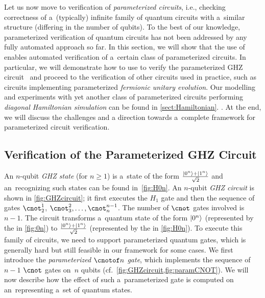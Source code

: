 Let us now move to verification of \emph{parameterized circuits}, i.e., checking
correctness of a~(typically) infinite family of quantum circuits with
a~similar structure (differing in the number of qubits).
To the best of our knowledge, parameterized verification of quantum circuits has
not been addressed by any fully automated approach so far.
In this section, we will show that the use of \lstas enables automated
verification of a~certain class of parameterized circuits.
In particular, 
we will demonstrate how to use \lstas to verify the parameterized GHZ
circuit~\cite{GreenbergerHZ89} and proceed to the verification of
other circuits used in practice, such as circuits implementing parameterized
\emph{fermionic unitary evolution}. Our modelling and experiments with yet another
class of parameterized circuits performing \emph{diagonal Hamiltonian
simulation} can be found in
\ifTR
\cref{sect:Hamiltonian}.
\else
\cite{techrep}.
\fi
At the end, we will discuss the challenges and a direction towards a~complete framework
for parameterized circuit verification.


\vspace{-0.0mm}
\subsection{Verification of the Parameterized GHZ Circuit}\label{sec:GHZ}
\vspace{-0.0mm}

An $n$-qubit \emph{GHZ state} (for $n \geq 1$) is a~state of the form
$\frac{\ket{0^n}+\ket{1^n}}{\sqrt{2}}$ and an~\lsta recognizing such states can be
found in~\cref{fig:H0n}. 
An $n$-qubit \emph{GHZ circuit} is shown in \cref{fig:GHZcircuit}; it first
executes the $H_1$ gate and then the sequence of gates $\cnot^{1}_{2}$,
$\cnot^{2}_{3},\ldots, \cnot^{n-1}_{n}$.
The number of $\cnot$ gates involved is $n-1$. 
The circuit transforms a~quantum state of the form $\ket{0^n}$ (represented by the \lsta in
\cref{fig:0n}) to $\frac{\ket{0^n}+\ket{1^n}}{\sqrt{2}}$ (represented
by the \lsta in \cref{fig:H0n}).
To execute this family of circuits, we need to support parameterized quantum gates, which
is generally hard but still feasible in our framework for some cases.
We first introduce the \emph{parameterized $\cnotof n$ gate}, which
implements the sequence of $n-1$ $ \cnot$ gates on~$n$ qubits
(cf.~\cref{fig:GHZcircuit,fig:paramCNOT}).
We will now describe how the effect of such a~parameterized gate is computed on
an~\lsta representing a~set of quantum states.

